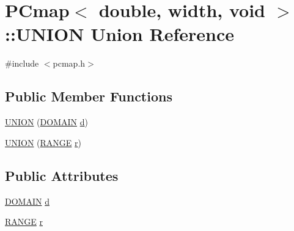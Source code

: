 \hypertarget{union_p_cmap_3_01double_00_01width_00_01void_01_4_1_1_u_n_i_o_n}{}\section{P\+Cmap$<$ double, width, void $>$\+:\+:U\+N\+I\+O\+N Union Reference}
\label{union_p_cmap_3_01double_00_01width_00_01void_01_4_1_1_u_n_i_o_n}


{\ttfamily \#include $<$pcmap.\+h$>$}

\subsection*{Public Member Functions}
\begin{DoxyCompactItemize}
\item 
\hyperlink{union_p_cmap_3_01double_00_01width_00_01void_01_4_1_1_u_n_i_o_n_a0723f9413b3be581b241f59889db1367}{U\+N\+I\+O\+N} (\hyperlink{struct_p_cmap_3_01double_00_01width_00_01void_01_4_acea4b293ccc18a675fd7dc227fd28891}{D\+O\+M\+A\+I\+N} \hyperlink{union_p_cmap_3_01double_00_01width_00_01void_01_4_1_1_u_n_i_o_n_ad3136120a5b816e73044fc0f4373a506}{d})
\item 
\hyperlink{union_p_cmap_3_01double_00_01width_00_01void_01_4_1_1_u_n_i_o_n_a6875f28078f5310ab6d6bdce255f6dd1}{U\+N\+I\+O\+N} (\hyperlink{struct_p_cmap_3_01double_00_01width_00_01void_01_4_a6351f3fa8772b15ba03129e5fd7edce1}{R\+A\+N\+G\+E} \hyperlink{union_p_cmap_3_01double_00_01width_00_01void_01_4_1_1_u_n_i_o_n_a451f19f6f97a069f7c465b069590e3c8}{r})
\end{DoxyCompactItemize}
\subsection*{Public Attributes}
\begin{DoxyCompactItemize}
\item 
\hyperlink{struct_p_cmap_3_01double_00_01width_00_01void_01_4_acea4b293ccc18a675fd7dc227fd28891}{D\+O\+M\+A\+I\+N} \hyperlink{union_p_cmap_3_01double_00_01width_00_01void_01_4_1_1_u_n_i_o_n_ad3136120a5b816e73044fc0f4373a506}{d}
\item 
\hyperlink{struct_p_cmap_3_01double_00_01width_00_01void_01_4_a6351f3fa8772b15ba03129e5fd7edce1}{R\+A\+N\+G\+E} \hyperlink{union_p_cmap_3_01double_00_01width_00_01void_01_4_1_1_u_n_i_o_n_a451f19f6f97a069f7c465b069590e3c8}{r}
\end{DoxyCompactItemize}



